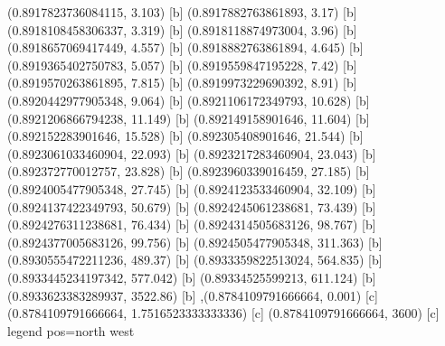 {{{(0.8917823736084115, 3.103) [b] 
(0.8917882763861893, 3.17) [b] 
(0.8918108458306337, 3.319) [b] 
(0.8918118874973004, 3.96) [b] 
(0.8918657069417449, 4.557) [b] 
(0.8918882763861894, 4.645) [b] 
(0.8919365402750783, 5.057) [b] 
(0.8919559847195228, 7.42) [b] 
(0.8919570263861895, 7.815) [b] 
(0.8919973229690392, 8.91) [b] 
(0.8920442977905348, 9.064) [b] 
(0.8921106172349793, 10.628) [b] 
(0.8921206866794238, 11.149) [b] 
(0.892149158901646, 11.604) [b] 
(0.892152283901646, 15.528) [b] 
(0.892305408901646, 21.544) [b] 
(0.8923061033460904, 22.093) [b] 
(0.8923217283460904, 23.043) [b] 
(0.892372770012757, 23.828) [b] 
(0.8923960339016459, 27.185) [b] 
(0.8924005477905348, 27.745) [b] 
(0.8924123533460904, 32.109) [b] 
(0.8924137422349793, 50.679) [b] 
(0.8924245061238681, 73.439) [b] 
(0.8924276311238681, 76.434) [b] 
(0.8924314505683126, 98.767) [b] 
(0.8924377005683126, 99.756) [b] 
(0.8924505477905348, 311.363) [b] 
(0.8930555472211236, 489.37) [b] 
(0.8933359822513024, 564.835) [b] 
(0.8933445234197342, 577.042) [b] 
(0.89334525599213, 611.124) [b] 
(0.8933623383289937, 3522.86) [b] 
},{(0.8784109791666664, 0.001) [c] 
(0.8784109791666664, 1.7516523333333336) [c] 
(0.8784109791666664, 3600) [c] 
}}}{legend pos=north west}